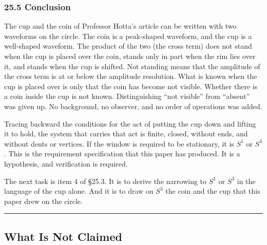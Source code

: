 \documentclass[
  a4paper,
]{article}
\begin{document}
\subsubsection{25.5 Conclusion}\label{conclusion}

The cup and the coin of Professor Hotta's article can be written with
two waveforms on the circle. The coin is a peak-shaped waveform, and the
cup is a well-shaped waveform. The product of the two (the cross term)
does not stand when the cup is placed over the coin, stands only in part
when the rim lies over it, and stands when the cup is shifted. Not
standing means that the amplitude of the cross term is at or below the
amplitude resolution. What is known when the cup is placed over is only
that the coin has become not visible. Whether there is a coin inside the
cup is not known. Distinguishing ``not visible'' from ``absent'' was
given up. No background, no observer, and no order of operations was
added.

Tracing backward the conditions for the act of putting the cup down and
lifting it to hold, the system that carries that act is finite, closed,
without ends, and without dents or vertices. If the window is required
to be stationary, it is \(S^1\) or \(S^3\). This is the requirement
specification that this paper has produced. It is a hypothesis, and
verification is required.

The next task is item 4 of §25.3. It is to derive the narrowing to
\(S^1\) or \(S^3\) in the language of the cup alone. And it is to draw
on \(S^3\) the coin and the cup that this paper drew on the circle.

\begin{center}\rule{0.5\linewidth}{0.5pt}\end{center}

\subsection{What Is Not Claimed}\label{what-is-not-claimed}
\end{document}
